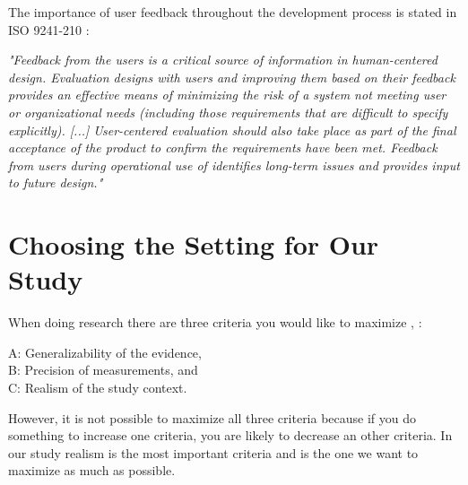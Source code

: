 The importance of user feedback throughout the development process is stated in ISO 9241-210 \cite{dis20109241}:

\emph{"Feedback from the users is a critical source of information in human-centered design. Evaluation designs with users and improving them based on their feedback provides an effective means of minimizing the risk of a system not meeting user or organizational needs (including those requirements that are difficult to specify explicitly).  [...] User-centered evaluation should also take place as part of the final acceptance of the product to confirm the requirements have been met. Feedback from users during operational use of identifies long-term issues and provides input to future design."}

\section{Choosing the Setting for Our Study}
\label{sec:experimental}
When doing research there are three criteria you would like to maximize \cite{McGrath}, \cite{alsos}: 
 
A: Generalizability of the evidence, \\
B: Precision of measurements, and \\
C: Realism of the study context.  

However, it is not possible  to maximize all three criteria because if you do something to increase one criteria, you are likely to decrease an other criteria. In our study realism is the most important criteria and is the one we want to maximize as much as possible.

